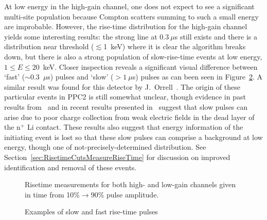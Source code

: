 At low energy in the high-gain channel, one does not expect to see a significant multi-site population because Compton scatters summing to such a small energy are improbable.  However, the rise-time distribution for the high-gain channel yields some interesting results: the strong line at $0.3~\mu$s still exists and there is a distribution near threshold ($\lesssim$1~keV) where it is clear the algorithm breaks down, but there is also a strong population of slow-rise-time events at low energy, $1\leq E \leq20$~keV.  Closer inspection reveals a significant visual difference between `fast' ($\sim$0.3~$\mu$s) pulses and `slow' ($>1~\mu$s) pulses as can been seen in Figure~\ref{fig:PPC2RisetimeExamplePulses}.  A similar result was found for this detector by J.~Orrell~\cite{Orrell}.  The origin of these particular events in PPC2 is still somewhat unclear, though evidence in past results from~\cite{Strauss196780,Sakai:1971ff} and in recent results presented in~\cite{Aalseth:2010aa} suggest that slow pulses can arise due to poor charge collection from weak electric fields in the dead layer of the n$^{+}$ Li contact.  These results also suggest that energy information of the initiating event is lost so that these slow pulses can comprise a background at low energy, though one of not-precisely-determined distribution.  See Section~\ref{sec:RisetimeCutsMeasureRiseTime} for discussion on improved identification and removal of these events.
	
				\begin{figure}
					\centering
					\caption{Risetime measurements for both high- and low-gain channels given in time from 10\%$\to$90\% pulse amplitude.}
					\label{fig:PPC2RisetimeCalculations}
				\end{figure}		
	
				\begin{figure}
					\centering
					\caption{Examples of slow and fast rise-time pulses}
					\label{fig:PPC2RisetimeExamplePulses}
				\end{figure}		
			
